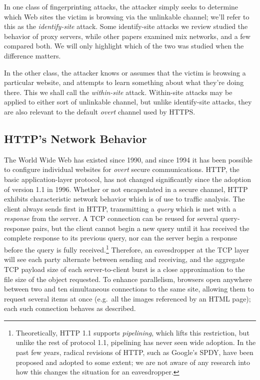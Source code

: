 \documentclass{zarticle}
\begin{document}
In one class of fingerprinting attacks, the attacker simply seeks to
determine which Web sites the victim is browsing via the unlinkable
channel; we'll refer to this as the \emph{identify-site} attack.  Some
identify-site attacks we review studied the behavior of proxy servers,
while other papers examined mix networks, and a few compared both.  We
will only highlight which of the two was studied when the difference
matters.

In the other class, the attacker knows or assumes that the victim is
browsing a particular website, and attempts to learn something about
what they're doing there.  This we shall call the \emph{within-site}
attack.  Within-site attacks may be applied to either sort of
unlinkable channel, but unlike identify-site attacks, they are also
relevant to the default \emph{overt} channel used by HTTPS.

\subsection{HTTP's Network Behavior}

The World Wide Web has existed since 1990, and since 1994 it has been
possible to configure individual websites for \emph{overt} secure
communications.  HTTP, the basic application-layer protocol, has not
changed significantly since the adoption of version 1.1 in 1996.
Whether or not encapsulated in a secure channel, HTTP exhibits
characteristic network behavior which is of use to traffic analysis.
The client always sends first in HTTP, transmitting a \emph{query}
which is met with a \emph{response} from the server.  A TCP connection
can be reused for several query-response pairs, but the client cannot
begin a new query until it has received the complete response to its
previous query, nor can the server begin a response before the query
is fully received.\footnote{Theoretically, HTTP 1.1 supports
  \emph{pipelining}, which lifts this restriction, but unlike the rest
  of protocol 1.1, pipelining has never seen wide adoption.  In the
  past few years, radical revisions of HTTP, such as Google's SPDY,
  have been proposed and adopted to some extent; we are not aware of
  any research into how this changes the situation for an
  eavesdropper.}  Therefore, an eavesdropper at the TCP layer will see
each party alternate between sending and receiving, and the aggregate
TCP payload size of each server-to-client burst is a close
approximation to the file size of the object requested.  To enhance
parallelism, browsers open anywhere between two and ten simultaneous
connections to the same site, allowing them to request several items
at once (e.g.\ all the images referenced by an HTML page); each such
connection behaves as described.
\end{document}
